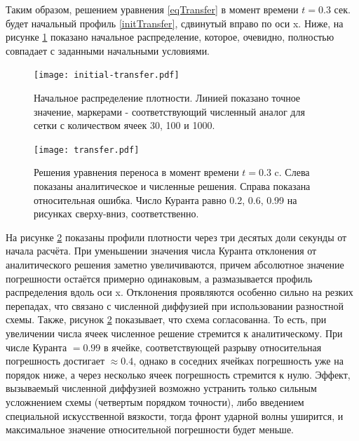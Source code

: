 \documentclass[a4paper]{article}
\begin{document}
	Таким образом, решением уравнения \eqref{eqTransfer} в момент времени $t = 0.3$ сек. будет начальный профиль \eqref{initTransfer}, сдвинутый вправо по оси x. 
	Ниже, на рисунке \ref{initTransferPlot} показано начальное распределение, которое, очевидно, полностью совпадает с заданными начальными условиями. 
	\begin{figure}[h]
		\centering
		\texttt{[image: initial-transfer.pdf]}
		\caption{Начальное распределение плотности. Линией показано точное значение, маркерами - соответствующий численный аналог для сетки с количеством ячеек 30, 100 и 1000.}
		\label{initTransferPlot}
	\end{figure}
	\begin{figure}[!h]
	\centering
	\texttt{[image: transfer.pdf]}
	\caption{Решения уравнения переноса в момент времени $t = 0.3$ c. Слева показаны аналитическое и  численные решения. Справа показана относительная ошибка. Число Куранта равно 0.2, 0.6, 0.99 на рисунках сверху-вниз, соответственно.}
	\label{TransferPlot}
	\end{figure}
	На рисунке \ref{TransferPlot} показаны профили плотности через три десятых доли секунды от начала расчёта. При уменьшении значения числа Куранта отклонения от аналитического решения заметно увеличиваются, причем абсолютное значение погрешности остаётся примерно одинаковым, а размазывается профиль распределения вдоль оси x.
	Отклонения проявляются особенно сильно на резких перепадах, что связано с численной диффузией при использовании разностной схемы. 
	Также, рисунок \ref{TransferPlot} показывает, что схема согласованна. То есть, при увеличении числа ячеек численное решение стремится к аналитическому. 
	При числе Куранта $=0.99$ в ячейке, соответствующей разрыву относительная погрешность достигает $\approx 0.4$, однако в соседних ячейках погрешность уже на порядок ниже, а через несколько ячеек погрешность стремится к нулю. 
	Эффект, вызываемый численной диффузией возможно устранить только сильным усложнением схемы (четвертым порядком точности), либо введением специальной искусственной вязкости, тогда фронт ударной волны уширится, и максимальное значение относительной погрешности будет меньше. 
	
	

	
\end{document}
